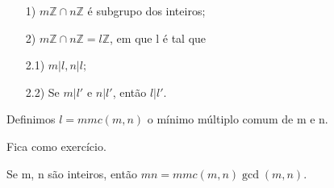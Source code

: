 \documentclass[Algebra/algebra_notes.tex]{subfiles}
\begin{document}
\begin{prop*}
	\begin{itemize}
		\item[1)] $m \mathbb{Z}\cap n \mathbb{Z}$ é subgrupo dos inteiros;
		\item[2)] $m \mathbb{Z}\cap n \mathbb{Z} = l \mathbb{Z}$, em que l é tal que
		\item[2.1)] $m | l, n | l;$
		\item[2.2)] Se $m | l'$ e $n | l'$, então $l | l'.$
	\end{itemize}
	Definimos $l = mmc(m, n)$ o mínimo múltiplo comum de m e n.
\end{prop*}
\begin{proof*}
	Fica como exercício.
\end{proof*}
\begin{crl*}
	Se m, n são inteiros, então $mn = mmc(m, n)\gcd{(m, n)}$.
\end{crl*}
\end{document}
